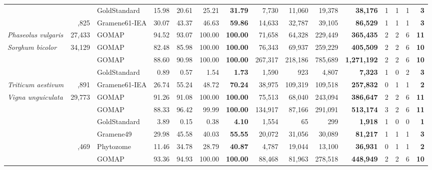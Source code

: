 \documentclass[utf8]{frontiersSCNS}
\begin{document}
\begin{table}[t]
{\begin{threeparttable}
\begin{tabular}{lrlrrr>{\bfseries}r|rrr>{\bfseries}r|rrr>{\bfseries}r}
 &  & GoldStandard & 15.98 & 20.61 & 25.21 & 31.79 & 7,730 & 11,060 & 19,378 & 38,176 & 1 & 1 & 1 & 3\\

\rowcolor{gray!6}  \multirow{-3}{*}{\raggedright\arraybackslash \textit{Oryza sativa}} & \multirow{-3}{*}{\raggedleft\arraybackslash 35,825} & Gramene61-IEA & 30.07 & 43.37 & 46.63 & 59.86 & 14,633 & 32,787 & 39,105 & 86,529 & 1 & 1 & 1 & 3\\
\cmidrule{1-15}
\textit{Phaseolus vulgaris} & 27,433 & GOMAP & 94.52 & 93.07 & 100.00 & 100.00 & 71,658 & 64,328 & 229,449 & 365,435 & 2 & 2 & 6 & 11\\
\cmidrule{1-15}
\rowcolor{gray!6}  \textit{Sorghum bicolor} & 34,129 & GOMAP & 82.48 & 85.98 & 100.00 & 100.00 & 76,343 & 69,937 & 259,229 & 405,509 & 2 & 2 & 6 & 10\\
\cmidrule{1-15}
 &  & GOMAP & 88.60 & 90.98 & 100.00 & 100.00 & 267,317 & 218,186 & 785,689 & 1,271,192 & 2 & 2 & 6 & 10\\

\rowcolor{gray!6}   &  & GoldStandard & 0.89 & 0.57 & 1.54 & 1.73 & 1,590 & 923 & 4,807 & 7,323 & 1 & 0 & 2 & 3\\

\multirow{-3}{*}{\raggedright\arraybackslash \textit{Triticum aestivum}} & \multirow{-3}{*}{\raggedleft\arraybackslash 107,891} & Gramene61-IEA & 26.74 & 55.24 & 48.72 & 70.24 & 38,975 & 109,319 & 109,518 & 257,832 & 0 & 1 & 1 & 2\\
\cmidrule{1-15}
\rowcolor{gray!6}  \textit{Vigna unguiculata} & 29,773 & GOMAP & 91.26 & 91.08 & 100.00 & 100.00 & 75,513 & 68,040 & 243,094 & 386,647 & 2 & 2 & 6 & 11\\
\cmidrule{1-15}
 &  & GOMAP & 88.33 & 96.42 & 99.99 & 100.00 & 134,917 & 87,166 & 291,091 & 513,174 & 3 & 2 & 6 & 11\\

\rowcolor{gray!6}   &  & GoldStandard & 3.89 & 0.15 & 0.38 & 4.10 & 1,554 & 65 & 299 & 1,918 & 1 & 0 & 0 & 1\\

 &  & Gramene49 & 29.98 & 45.58 & 40.03 & 55.55 & 20,072 & 31,056 & 30,089 & 81,217 & 1 & 1 & 1 & 3\\

\rowcolor{gray!6}  \multirow{-4}{*}{\raggedright\arraybackslash \textit{Zea mays} B73.v3} & \multirow{-4}{*}{\raggedleft\arraybackslash 39,469} & Phytozome & 11.46 & 34.78 & 28.79 & 40.87 & 4,787 & 19,044 & 13,100 & 36,931 & 0 & 1 & 1 & 2\\
\cmidrule{1-15}
 &  & GOMAP & 93.36 & 94.93 & 100.00 & 100.00 & 88,468 & 81,963 & 278,518 & 448,949 & 2 & 2 & 6 & 10\\


\end{tabular}
\end{threeparttable}}
\end{table}
\end{document}
